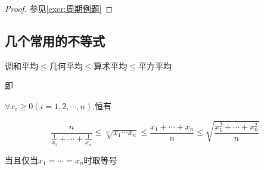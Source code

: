 \begin{proof}

    参见\cref{exer:周期例题}
\end{proof}

\subsection{几个常用的不等式}

\begin{theorem}[均值不等式]
    调和平均$\le$几何平均$\le$算术平均$\le$平方平均

    即

    $\forall x_i\ge 0(i=1,2,\cdots,n)$,恒有

    \begin{equation}    \label{均值不等式}
        \frac{n}{\frac{1}{x_1}+\cdots+\frac{1}{x_n}}\le \sqrt[n]{x_1\cdots x_n}\le  \frac{x_1+\cdots+x_n}{n} \le \sqrt{\frac{x_1^2+\cdots+x_n^2}{n}}
    \end{equation}

    当且仅当$x_1=\cdots=x_n$时取等号
\end{theorem}

